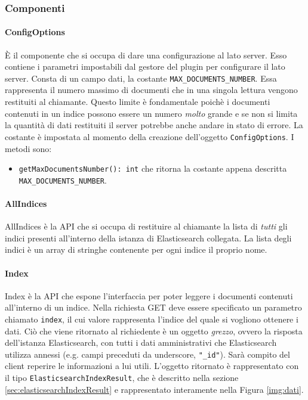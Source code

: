 \subsubsection{Componenti}

\paragraph{ConfigOptions} \Spazio
È il componente che si occupa di dare una configurazione al lato server. Esso contiene i parametri impostabili dal gestore del plugin per configurare il lato server. Consta di un campo dati, la costante \texttt{MAX\_DOCUMENTS\_NUMBER}. Essa rappresenta il numero massimo di documenti che in una singola lettura vengono restituiti al chiamante. Questo limite è fondamentale poichè i documenti contenuti in un indice possono essere un numero \emph{molto} grande e se non si limita la quantità di dati restituiti il server potrebbe anche andare in stato di errore. La costante è impostata al momento della creazione dell'oggetto \texttt{ConfigOptions}. I metodi sono: 
\begin{itemize}
	\item \texttt{getMaxDocumentsNumber(): int} che ritorna la costante appena descritta \texttt{MAX\_DOCUMENTS\_NUMBER}.
\end{itemize}

\paragraph{AllIndices} \Spazio
AllIndices è la API che si occupa di restituire al chiamante la lista di \emph{tutti} gli indici presenti all'interno della istanza di Elasticsearch collegata. La lista degli indici è un array di stringhe contenente per ogni indice il proprio nome.

\paragraph{Index} \Spazio
Index è la API che espone l'interfaccia per poter leggere i documenti contenuti all'interno di un indice. Nella richiesta GET deve essere specificato un parametro chiamato \texttt{index}, il cui valore rappresenta l'indice del quale si vogliono ottenere i dati. Ciò che viene ritornato al richiedente è un oggetto \emph{grezzo}, ovvero la risposta dell'istanza Elasticsearch, con tutti i dati amministrativi che Elasticsearch utilizza annessi (e.g. campi preceduti da underscore, \texttt{"\_id"}). Sarà compito del client reperire le informazioni a lui utili. L'oggetto ritornato è rappresentato con il tipo \texttt{ElasticsearchIndexResult}, che è descritto nella sezione \ref{sec:elasticsearchIndexResult} e rappresentato interamente nella Figura \ref{img:dati}.

